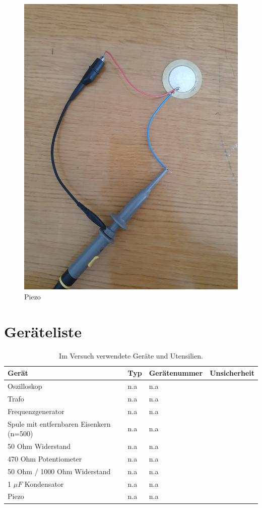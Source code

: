 \documentclass[12pt,a4paper,twoside]{article}
\begin{document}
\begin{figure}[H]
    \centering
    \includegraphics[width=0.6\linewidth, angle=0]{nudes/Piezo.jpg}
    \caption{Piezo}
    \label{fig:Piezo}
\end{figure}



\section{Geräteliste} %

    \begin{table}[H]
        \centering
        \caption{Im Versuch verwendete Geräte und Utensilien.}
        \label{tab:geraete}
        \begin{tabular}{| l | l | l | l |}
            \hline
            Gerät   & Typ   & Gerätenummer  & Unsicherheit \\
            \hline
            Oszilloskop & {n.a} & {n.a} \\
            Trafo & {n.a} & {n.a} \\
            Frequenzgenerator & {n.a} & {n.a} \\
            Spule mit entfernbaren Eisenkern (n=500) & {n.a} & {n.a} \\
            50 Ohm Widerstand & {n.a} & {n.a} \\
            470 Ohm Potentiometer & {n.a} & {n.a} \\
            50 Ohm / 1000 Ohm Widerstand & {n.a} & {n.a} \\
            1 $\mu F$ Kondensator& {n.a} & {n.a} \\
            Piezo & {n.a} & {n.a} \\
            \hline
        \end{tabular}
    \end{table}
\end{document}
